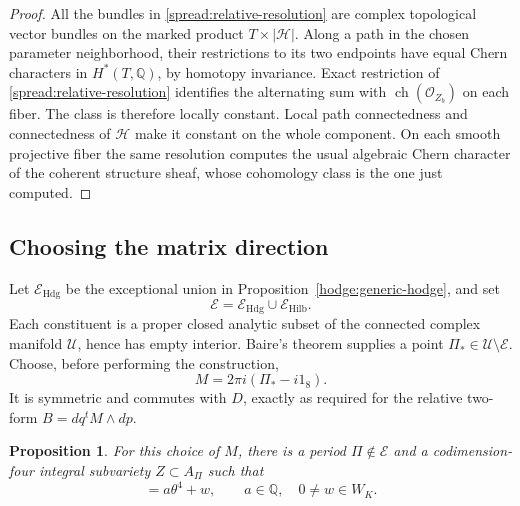 \documentclass[11pt]{article}
\newtheorem{proposition}[theorem]{Proposition}
\theoremstyle{definition}
\theoremstyle{remark}
\numberwithin{equation}{section}
\begin{document}
\begin{proof}
All the bundles in \eqref{spread:relative-resolution} are complex
topological vector bundles on the marked product
$T\times|\mathcal H|$.  Along a path in the chosen parameter neighborhood,
their restrictions to its two endpoints have equal Chern characters
in $H^*(T,\mathbb Q)$, by homotopy invariance.  Exact restriction of
\eqref{spread:relative-resolution} identifies the alternating sum with
$\operatorname{ch}(\mathcal O_{Z_b})$ on each fiber.  The class is therefore locally
constant.  Local path connectedness and connectedness of $\mathcal H$
make it constant on the whole component.  On each smooth projective
fiber the same resolution computes the usual algebraic Chern character
of the coherent structure sheaf, whose cohomology class is the one just
computed.
\end{proof}

\subsection{Choosing the matrix direction}

Let $\mathcal E_{\mathrm{Hdg}}$ be the exceptional union in
Proposition~\ref{hodge:generic-hodge}, and set
\[
 \mathcal E=\mathcal E_{\mathrm{Hdg}}\cup
               \mathcal E_{\mathrm{Hilb}}.
\]
Each constituent is a proper closed analytic subset of the connected
complex manifold $\mathcal U$, hence has empty interior.  Baire's
theorem supplies a point $\Pi_*\in\mathcal U\setminus\mathcal E$.
Choose, before performing the construction,
\begin{equation}
 M=2\pi i(\Pi_*-i1_8).
 \label{spread:direction}
\end{equation}
It is symmetric and commutes with $D$, exactly as required for the
relative two-form $B=dq^tM\wedge dp$.

\begin{proposition}
\label{spread:period-selection}
For this choice of $M$, there is a period $\Pi\notin\mathcal E$
and a codimension-four integral subvariety $Z\subset A_\Pi$ such that
\begin{equation}
 [Z]=a\theta^4+w,\qquad a\in\mathbb Q,\quad 0\ne w\in W_K.
 \label{spread:selected-cycle}
\end{equation}
\end{proposition}
\end{document}
